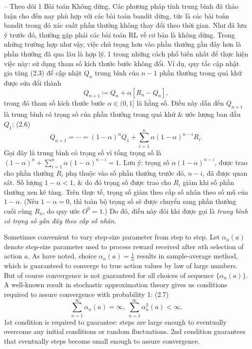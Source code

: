 \documentclass{article}
\begin{document}
\begin{itemize}
\begin{itemize}
        -- {\sf Theo dõi 1 Bài toán Không dừng.} Các phương pháp tính trung bình đã thảo luận cho đến nay phù hợp với các bài toán bandit dừng, tức là các bài toán bandit trong đó xác suất phần thưởng không thay đổi theo thời gian. Như đã lưu ý trước đó, thường gặp phải các bài toán RL về cơ bản là không dừng. Trong những trường hợp như vậy, việc chú trọng hơn vào phần thưởng gần đây hơn là phần thưởng đã qua lâu là hợp lý. 1 trong những cách phổ biến nhất để thực hiện việc này: sử dụng tham số kích thước bước không đổi. Ví dụ, quy tắc cập nhật gia tăng (2.3) để cập nhật $Q_n$ trung bình của $n - 1$ phần thưởng trong quá khứ được sửa đổi thành
        \begin{equation*}
            Q_{n+1}\coloneqq Q_n + \alpha[R_n - Q_n],
        \end{equation*}
        trong đó tham số kích thước bước $\alpha\in(0,1]$ là hằng số. Điều này dẫn đến $Q_{n+1}$ là trung bình có trọng số của phần thưởng trong quá khứ \& ước lượng ban đầu $Q_1$: (2.6)
        \begin{equation*}
            Q_{n+1} = \cdots = (1 - \alpha)^nQ_1 + \sum_{i=1}^n \alpha(1 - \alpha)^{n - i}R_i.
        \end{equation*}
        Gọi đây là trung bình có trọng số vì tổng trọng số là $(1 - \alpha)^n + \sum_{i=1}^n \alpha(1 - \alpha)^{n - i} = 1$. Lưu ý: trọng số $\alpha(1 - \alpha)^{n-i}$, được trao cho phần thưởng $R_i$ phụ thuộc vào số phần thưởng trước đó, $n - i$, đã được quan sát. Số lượng $1 - \alpha < 1$, \& do đó trọng số được trao cho $R_i$ giảm khi số phần thưởng xen kẽ tăng. Trên thực tế, trọng số giảm theo cấp số nhân theo số mũ của $1 - \alpha$. (Nếu $1 - \alpha = 0$, thì toàn bộ trọng số sẽ được chuyển sang phần thưởng cuối cùng $R_n$, do quy ước $O^0 = 1$.) Do đó, điều này đôi khi được gọi là {\it trung bình có trọng số gần đây theo cấp số nhân}.

        Sometimes convenient to vary step-size parameter from step to step. Let $\alpha_n(a)$ denote step-size parameter used to process reward received after $n$th selection of action $a$. As have noted, choice $\alpha_n(a) = \frac{1}{n}$ results in sample-average method, which is guaranteed to converge to true action values by law of large numbers. But of course convergence is not guaranteed for all choices of sequence $\{\alpha_n(a)\}$. A well-known result in stochastic approximation theory gives us conditions required to assure convergence with probability 1: (2.7)
        \begin{equation*}
            \sum_{n=1}^\infty \alpha_n(a) = \infty,\  \sum_{n=1}^\infty \alpha_n^2(a) < \infty.
        \end{equation*}
        1st condition is required to guarantee: steps are large enough to eventually overcome any initial conditions or random fluctuations. 2nd condition guarantees that eventually steps become small enough to assure convergence.


\end{itemize}
\end{itemize}
\end{document}
